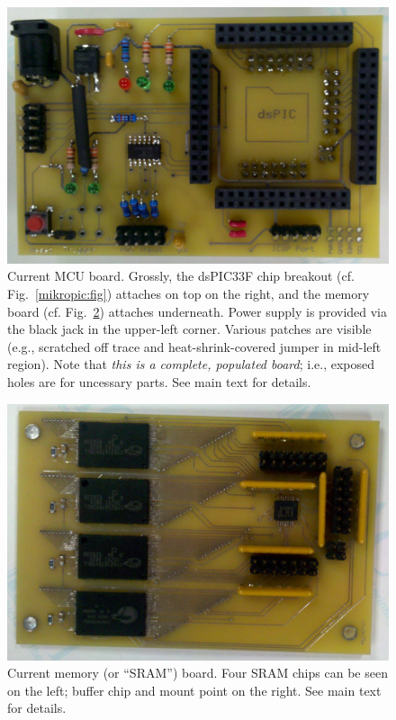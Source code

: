 \documentclass[letterpaper]{article}
\begin{document}
\begin{figure}
\centering
\includegraphics[width=\textwidth]{figures/old_mcu_board.jpg}
\caption[Current microcontroller board]{Current MCU board. Grossly,
  the dsPIC33F chip breakout (cf. Fig.~\ref{mikropic:fig}) attaches on
  top on the right, and the memory board (cf. Fig.~\ref{oldmem:fig})
  attaches underneath. Power supply is provided via the black jack in
  the upper-left corner. Various patches are visible (e.g., scratched
  off trace and heat-shrink-covered jumper in mid-left region). Note
  that \textit{this is a complete, populated board}; i.e., exposed
  holes are for uncessary parts. See main text for details.}
\label{oldmcu:fig}
\end{figure}

\begin{figure}
\centering
\includegraphics[width=\textwidth]{figures/old_mem_board.jpg}
\caption[Current memory board]{Current memory (or ``SRAM'')
  board. Four SRAM chips can be seen on the left; buffer chip and
  mount point on the right. See main text for details.}
\label{oldmem:fig}
\end{figure}
\end{document}
